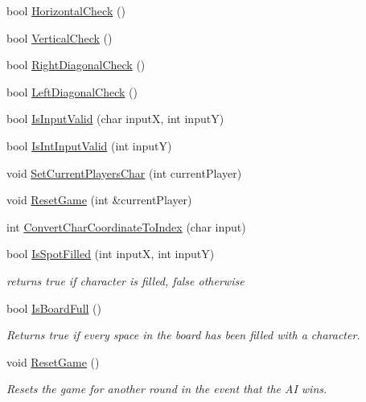 \begin{DoxyCompactItemize}
bool \hyperlink{classTicTacToe_afce358eabb849ae0dbf55818a7bdc56b}{Horizontal\-Check} ()
\item 
bool \hyperlink{classTicTacToe_aff214a5737d06961a5f6a14cf97ed1fe}{Vertical\-Check} ()
\item 
bool \hyperlink{classTicTacToe_a3b96d4252e042b2e85bb0bc9a501bc0c}{Right\-Diagonal\-Check} ()
\item 
bool \hyperlink{classTicTacToe_ad65a6d8382d7a59c68a6778caea91d78}{Left\-Diagonal\-Check} ()
\item 
bool \hyperlink{classTicTacToe_a6c8bc2be4b6fc3f462905252c70b5183}{Is\-Input\-Valid} (char input\-X, int input\-Y)
\item 
bool \hyperlink{classTicTacToe_a5182bf8f6a082e22e522b31bdd179df7}{Is\-Int\-Input\-Valid} (int input\-Y)
\item 
void \hyperlink{classTicTacToe_a3c05c5ac2c16a02a6a3c3b2021fdde74}{Set\-Current\-Players\-Char} (int current\-Player)
\item 
void \hyperlink{classTicTacToe_a740fc2c6b0526442ead17835c473f93e}{Reset\-Game} (int \&current\-Player)
\item 
int \hyperlink{classTicTacToe_a40ab96fced3061640200f5e7b83e0415}{Convert\-Char\-Coordinate\-To\-Index} (char input)
\item 
bool \hyperlink{classTicTacToe_a7b1ba09a855c9a3f71e3e06b3e76a992}{Is\-Spot\-Filled} (int input\-X, int input\-Y)
\begin{DoxyCompactList}\small\item\em returns true if character is filled, false otherwise \end{DoxyCompactList}\item 
bool \hyperlink{classTicTacToe_a7bb5521e85c2a1d4c61ab405d03a62c5}{Is\-Board\-Full} ()
\begin{DoxyCompactList}\small\item\em Returns true if every space in the board has been filled with a character. \end{DoxyCompactList}\item 
void \hyperlink{classTicTacToe_a36b58f33246558d0b7b34412b641cff6}{Reset\-Game} ()
\begin{DoxyCompactList}\small\item\em Resets the game for another round in the event that the A\-I wins. \end{DoxyCompactList}\end{DoxyCompactItemize}
